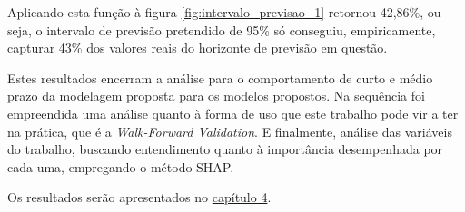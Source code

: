 Aplicando esta função à figura \ref{fig:intervalo_previsao_1} retornou 42,86\%, ou seja, o intervalo de previsão pretendido de 95\% só conseguiu, empiricamente, capturar 43\% dos valores reais do horizonte de previsão em questão.

Estes resultados encerram a análise para o comportamento de curto e médio prazo da modelagem proposta para os modelos propostos. Na sequência foi empreendida uma análise quanto à forma de uso que este trabalho pode vir a ter na prática, que é a \textit{Walk-Forward Validation}. E finalmente, análise das variáveis do trabalho, buscando entendimento quanto à importância desempenhada por cada uma, empregando o método SHAP.



Os resultados serão apresentados no \hyperref[cap:capitulo4]{capítulo 4}.
\clearpage



